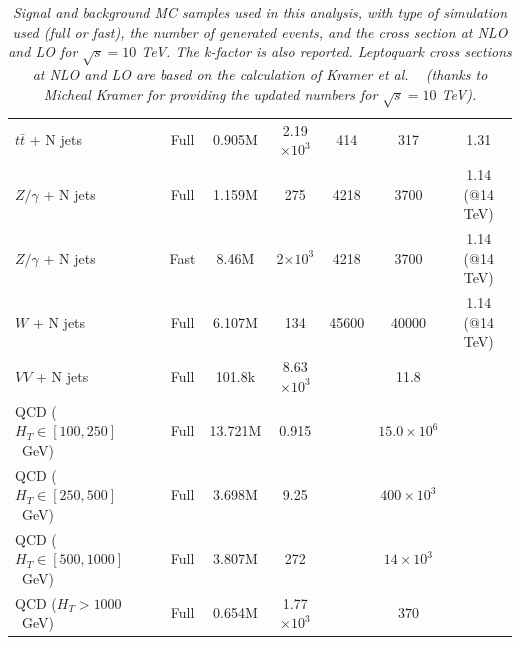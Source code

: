 \documentclass{cmspaper}
\begin{document}
\begin{linenumbers}
\begin{table}[htb]
\begin{center}
\begin{tabular}{|l|cccccc|}
\hline
      $t\bar{t}$ + N jets         & Full      & 0.905M    &    2.19$\times 10^3$   & 414                 &  317                  & 1.31 \\
      $Z/\gamma$ + N jets         & Full      & 1.159M    &    275	           & 4218                &  3700                 & 1.14 (@14 TeV)\\
      $Z/\gamma$ + N jets         & Fast      & 8.46M     &    2$\times 10^3$      & 4218                &  3700                 & 1.14 (@14 TeV)\\
      $W$ + N jets                & Full      & 6.107M    &     134	           & 45600               &  40000                & 1.14 (@14 TeV)\\
      $VV$ + N jets               & Full      & 101.8k    &    8.63$\times 10^3$   &                     &  11.8                 & \\ \hline
      QCD ($H_T\in[100,250]$~GeV) & Full      & 13.721M   &    0.915	           &                     &  $15.0 \times 10^6$   & \\
      QCD ($H_T\in[250,500]$~GeV) & Full      & 3.698M    &    9.25	           &                     &  $400 \times 10^3$    & \\
      QCD ($H_T\in[500,1000]$~GeV)& Full      & 3.807M    &     272	           &                     &  $14 \times 10^3$     & \\
      QCD ($H_T>1000$~GeV)        & Full      & 0.654M    &    1.77$\times 10^3$   &                     &  $370$                & \\
\hline\hline
    \end{tabular}
    \caption{\small \sl Signal and background MC samples used in this analysis,
 with type of simulation used (full or fast), the number of generated events, 
      and the cross section at NLO and LO for $\sqrt{s}=10$ TeV. 
      The k-factor is also reported. Leptoquark cross sections at NLO and LO
      are based on the calculation of Kramer {\it et al.} ~\cite{Kramer} (thanks to Micheal Kramer 
      for providing the updated numbers for $\sqrt{s}=10$ TeV).}
  \end{center}
\end{table}


\end{linenumbers}
\end{document}
